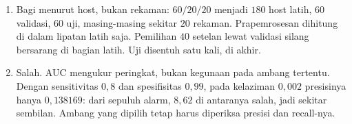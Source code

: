 \begin{enumerate}[label=\textbf{27.\arabic*}]
  \item Bagi menurut host, bukan rekaman: $60/20/20$ menjadi $180$ host latih,
        $60$ validasi, $60$ uji, masing-masing sekitar $20$ rekaman. Prapemrosesan
        dihitung di dalam lipatan latih saja. Pemilihan $40$ setelan lewat validasi
        silang bersarang di bagian latih. Uji disentuh satu kali, di akhir.

  \item Salah. AUC mengukur peringkat, bukan kegunaan pada ambang tertentu. Dengan
        sensitivitas $0{,}8$ dan spesifisitas $0{,}99$, pada kelaziman $0{,}002$
        presisinya hanya $0{,}138169$: dari sepuluh alarm, $8{,}62$ di antaranya
        salah, jadi sekitar sembilan. Ambang
        yang dipilih tetap harus diperiksa presisi dan recall-nya.
\end{enumerate}

